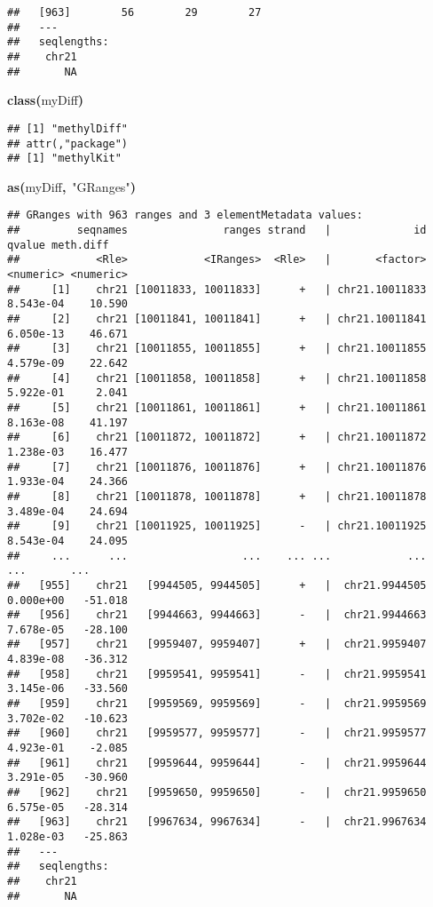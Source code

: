 \documentclass{article}
\makeatletter
\newcommand{\hlfunctioncall}[1]{\textcolor[rgb]{.5,0,.33}{\textbf{#1}}}%
\newcommand{\hlstring}[1]{\textcolor[rgb]{.6,.6,1}{#1}}%
\newcommand{\hlkeyword}[1]{\textbf{#1}}%
\newcommand{\hlsymbol}[1]{#1}%
\newenvironment{kframe}{%
 \def\FrameCommand##1{\hskip\@totalleftmargin \hskip-\fboxsep
 \colorbox{shadecolor}{##1}\hskip-\fboxsep
     \hskip-\linewidth \hskip-\@totalleftmargin \hskip\columnwidth}%
 \MakeFramed {\advance\hsize-\width
   \@totalleftmargin\z@ \linewidth\hsize
   \@setminipage}}%
 {\par\unskip\endMakeFramed}
\newenvironment{knitrout}{}{} %
\makeatother
\begin{document}
\begin{knitrout}
{\begin{kframe}
\begin{verbatim}
##   [963]        56        29        27
##   ---
##   seqlengths:
##    chr21
##       NA
\end{verbatim}
\begin{flushleft}
\ttfamily\noindent
\hlfunctioncall{class}\hlkeyword{(}\hlsymbol{myDiff}\hlkeyword{)}\mbox{}
\normalfont
\end{flushleft}
\begin{verbatim}
## [1] "methylDiff"
## attr(,"package")
## [1] "methylKit"
\end{verbatim}
\begin{flushleft}
\ttfamily\noindent
\hlfunctioncall{as}\hlkeyword{(}\hlsymbol{myDiff}\hlkeyword{,}{\ }\hlstring{"{}GRanges"{}}\hlkeyword{)}\mbox{}
\normalfont
\end{flushleft}
\begin{verbatim}
## GRanges with 963 ranges and 3 elementMetadata values:
##         seqnames               ranges strand   |             id    qvalue meth.diff
##            <Rle>            <IRanges>  <Rle>   |       <factor> <numeric> <numeric>
##     [1]    chr21 [10011833, 10011833]      +   | chr21.10011833 8.543e-04    10.590
##     [2]    chr21 [10011841, 10011841]      +   | chr21.10011841 6.050e-13    46.671
##     [3]    chr21 [10011855, 10011855]      +   | chr21.10011855 4.579e-09    22.642
##     [4]    chr21 [10011858, 10011858]      +   | chr21.10011858 5.922e-01     2.041
##     [5]    chr21 [10011861, 10011861]      +   | chr21.10011861 8.163e-08    41.197
##     [6]    chr21 [10011872, 10011872]      +   | chr21.10011872 1.238e-03    16.477
##     [7]    chr21 [10011876, 10011876]      +   | chr21.10011876 1.933e-04    24.366
##     [8]    chr21 [10011878, 10011878]      +   | chr21.10011878 3.489e-04    24.694
##     [9]    chr21 [10011925, 10011925]      -   | chr21.10011925 8.543e-04    24.095
##     ...      ...                  ...    ... ...            ...       ...       ...
##   [955]    chr21   [9944505, 9944505]      +   |  chr21.9944505 0.000e+00   -51.018
##   [956]    chr21   [9944663, 9944663]      -   |  chr21.9944663 7.678e-05   -28.100
##   [957]    chr21   [9959407, 9959407]      +   |  chr21.9959407 4.839e-08   -36.312
##   [958]    chr21   [9959541, 9959541]      -   |  chr21.9959541 3.145e-06   -33.560
##   [959]    chr21   [9959569, 9959569]      -   |  chr21.9959569 3.702e-02   -10.623
##   [960]    chr21   [9959577, 9959577]      -   |  chr21.9959577 4.923e-01    -2.085
##   [961]    chr21   [9959644, 9959644]      -   |  chr21.9959644 3.291e-05   -30.960
##   [962]    chr21   [9959650, 9959650]      -   |  chr21.9959650 6.575e-05   -28.314
##   [963]    chr21   [9967634, 9967634]      -   |  chr21.9967634 1.028e-03   -25.863
##   ---
##   seqlengths:
##    chr21
##       NA
\end{verbatim}
\end{kframe}}
\end{knitrout}
\end{document}
